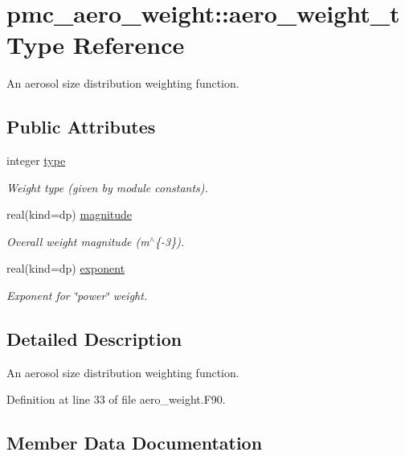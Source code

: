 \hypertarget{structpmc__aero__weight_1_1aero__weight__t}{}\section{pmc\+\_\+aero\+\_\+weight\+:\+:aero\+\_\+weight\+\_\+t Type Reference}
\label{structpmc__aero__weight_1_1aero__weight__t}


An aerosol size distribution weighting function.  


\subsection*{Public Attributes}
\begin{DoxyCompactItemize}
\item 
integer \mbox{\hyperlink{structpmc__aero__weight_1_1aero__weight__t_a05e0f83cc68670b5af437fcef89d358f}{type}}
\begin{DoxyCompactList}\small\item\em Weight type (given by module constants). \end{DoxyCompactList}\item 
real(kind=dp) \mbox{\hyperlink{structpmc__aero__weight_1_1aero__weight__t_a9d092c751e4ac7b33468e2e5346621f6}{magnitude}}
\begin{DoxyCompactList}\small\item\em Overall weight magnitude (m$^\wedge$\{-\/3\}). \end{DoxyCompactList}\item 
real(kind=dp) \mbox{\hyperlink{structpmc__aero__weight_1_1aero__weight__t_a5a294cab35b938716f72dcc47b6b5b85}{exponent}}
\begin{DoxyCompactList}\small\item\em Exponent for \char`\"{}power\char`\"{} weight. \end{DoxyCompactList}\end{DoxyCompactItemize}


\subsection{Detailed Description}
An aerosol size distribution weighting function. 

Definition at line 33 of file aero\+\_\+weight.\+F90.



\subsection{Member Data Documentation}
\mbox{\label{structpmc__aero__weight_1_1aero__weight__t_a5a294cab35b938716f72dcc47b6b5b85}} 
